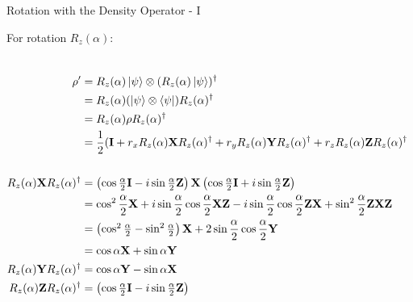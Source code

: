 \documentclass{beamer}
\begin{document}
\begin{frame}{Rotation with the Density Operator - I\tiny{\cite{rotationsonblochsphere}}}
  {\tiny
    For rotation $R_z(\alpha)$:
    \begin{columns}
    \begin{align*}
      \rho' &= R_z(\alpha)\ket{\psi} \otimes (R_z(\alpha)\ket{\psi})^{\dagger} \\
            &= R_z(\alpha)(\ket{\psi} \otimes \bra{\psi})R_z(\alpha)^{\dagger} \\
            &= R_z(\alpha) \rho R_z(\alpha)^{\dagger} \\
            &= \frac{1}2(\mathbf{I}  + r_x R_z(\alpha) \mathbf{X} R_z(\alpha)^{\dagger}
                                     + r_y R_z(\alpha) \mathbf{Y} R_z(\alpha)^{\dagger}
                                     + r_z R_z(\alpha) \mathbf{Z} R_z(\alpha)^{\dagger} \\
      \\
      R_z(\alpha) \mathbf{X} R_z(\alpha)^{\dagger}
            &=    \begin{pmatrix} \cos\frac{\alpha}2\mathbf{I} - i\sin\frac{\alpha}2 \mathbf{Z} \end{pmatrix}
                  \mathbf{X}
                  \begin{pmatrix} \cos\frac{\alpha}2\mathbf{I} + i\sin\frac{\alpha}2 \mathbf{Z} \end{pmatrix} \\
            &=    \cos^2\frac{\alpha}2 \mathbf{X}
                + i\sin\frac{\alpha}2 \cos\frac{\alpha}2 \mathbf{X}\mathbf{Z}
                - i\sin\frac{\alpha}2 \cos\frac{\alpha}2 \mathbf{Z}\mathbf{X}
                + \sin^2\frac{\alpha}2 \mathbf{Z}\mathbf{X}\mathbf{Z} \\
            &=    \begin{pmatrix} \cos^2\frac{\alpha}2 -  \sin^2\frac{\alpha}2 \end{pmatrix} \mathbf{X}
                + 2 \sin\frac{\alpha}2 \cos\frac{\alpha}2 \mathbf{Y} \\
            &= \cos\alpha \mathbf{X} + \sin\alpha \mathbf{Y} \\
      R_z(\alpha) \mathbf{Y} R_z(\alpha)^{\dagger}
            &=    \cos\alpha \mathbf{Y} - \sin\alpha \mathbf{X} \\
      R_z(\alpha) \mathbf{Z} R_z(\alpha)^{\dagger}
            &=    \begin{pmatrix} \cos\frac{\alpha}2\mathbf{I} - i\sin\frac{\alpha}2 \mathbf{Z} \end{pmatrix}

\end{align*}
\end{columns}}
\end{frame}
\end{document}
